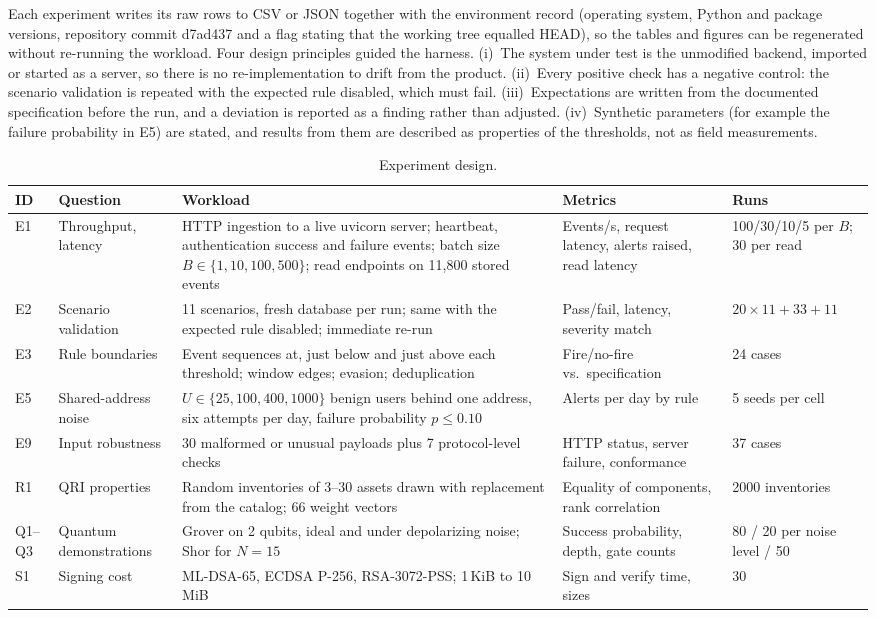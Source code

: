 \documentclass[conference]{IEEEtran}
\begin{document}
Each experiment writes its raw rows to CSV or JSON together with the environment record (operating system, Python and package versions, repository commit d7ad437 and a flag stating that the working tree equalled HEAD), so the tables and figures can be regenerated without re-running the workload. Four design principles guided the harness. (i)~The system under test is the unmodified backend, imported or started as a server, so there is no re-implementation to drift from the product. (ii)~Every positive check has a negative control: the scenario validation is repeated with the expected rule disabled, which must fail. (iii)~Expectations are written from the documented specification before the run, and a deviation is reported as a finding rather than adjusted. (iv)~Synthetic parameters (for example the failure probability in E5) are stated, and results from them are described as properties of the thresholds, not as field measurements.

\begin{table}[t]
\caption{Experiment design.}
\label{tab:design}
\centering
\footnotesize
\begin{tabularx}{\textwidth}{@{}l l X l l@{}}
\toprule
ID & Question & Workload & Metrics & Runs \\
\midrule
E1 & Throughput, latency & HTTP ingestion to a live uvicorn server; heartbeat, authentication success and failure events; batch size $B\in\{1,10,100,500\}$; read endpoints on 11,800 stored events & Events/s, request latency, alerts raised, read latency & 100/30/10/5 per $B$; 30 per read \\
E2 & Scenario validation & 11 scenarios, fresh database per run; same with the expected rule disabled; immediate re-run & Pass/fail, latency, severity match & $20\times 11 + 33 + 11$ \\
E3 & Rule boundaries & Event sequences at, just below and just above each threshold; window edges; evasion; deduplication & Fire/no-fire vs.\ specification & 24 cases \\
E5 & Shared-address noise & $U\in\{25,100,400,1000\}$ benign users behind one address, six attempts per day, failure probability $p\leq 0.10$ & Alerts per day by rule & 5 seeds per cell \\
E9 & Input robustness & 30 malformed or unusual payloads plus 7 protocol-level checks & HTTP status, server failure, conformance & 37 cases \\
R1 & QRI properties & Random inventories of 3--30 assets drawn with replacement from the catalog; 66 weight vectors & Equality of components, rank correlation & 2000 inventories \\
Q1--Q3 & Quantum demonstrations & Grover on 2 qubits, ideal and under depolarizing noise; Shor for $N=15$ & Success probability, depth, gate counts & 80 / 20 per noise level / 50 \\
S1 & Signing cost & ML-DSA-65, ECDSA P-256, RSA-3072-PSS; 1\,KiB to 10\,MiB & Sign and verify time, sizes & 30 \\
\bottomrule
\end{tabularx}
\end{table}
\end{document}
